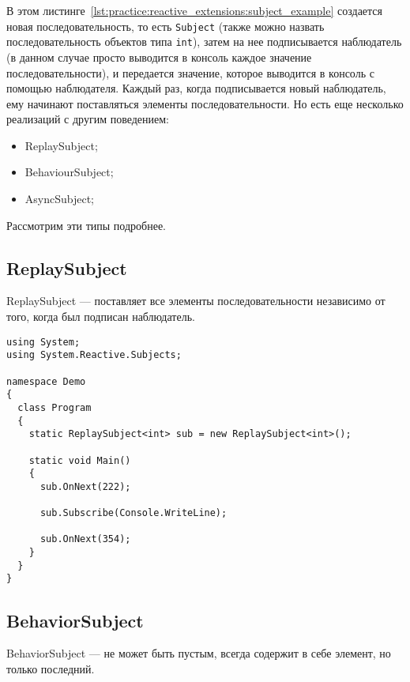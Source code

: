 В этом листинге~\ref{lst:practice:reactive_extensions:subject_example} создается новая последовательность, то есть \lstinline[style=csharpinlinestyle]!Subject!
(также можно назвать последовательность объектов типа \lstinline[style=csharpinlinestyle]!int!),
затем на нее подписывается наблюдатель (в данном случае просто выводится в консоль каждое значение последовательности),
и передается значение, которое выводится в консоль с помощью наблюдателя. Каждый раз, когда подписывается новый наблюдатель,
ему начинают поставляться элементы последовательности. Но есть еще несколько реализаций с другим поведением:

\begin{itemize}
  \item ReplaySubject;
  \item BehaviourSubject;
  \item AsyncSubject;
\end{itemize}

Рассмотрим эти типы подробнее.

\subsection{ReplaySubject}
\label{subsub:practice:reactive_extensions:replay_subject}

ReplaySubject --- поставляет все элементы последовательности независимо от того, когда был подписан наблюдатель.

\begin{lstlisting}[style=csharpinlinestyle, caption={Пример использования ReplaySubject}, label=lst:practice:reactive_extensions:replay_subject_example]
using System;
using System.Reactive.Subjects;

namespace Demo
{
  class Program
  {
    static ReplaySubject<int> sub = new ReplaySubject<int>();

    static void Main()
    {
      sub.OnNext(222);

      sub.Subscribe(Console.WriteLine);

      sub.OnNext(354);
    }
  }
}
\end{lstlisting}

\subsection{BehaviorSubject}
\label{subsub:practice:reactive_extensions:behavior_subject}

BehaviorSubject --- не может быть пустым, всегда содержит в себе элемент, но только последний.

